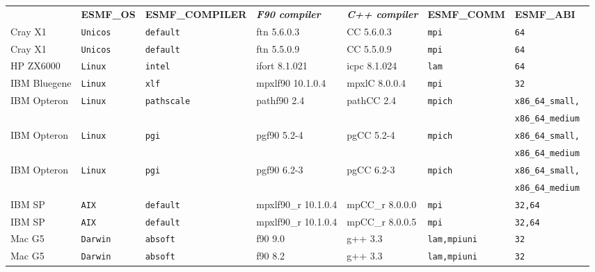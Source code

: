 \begin{tabular}{lllllll}
  &{\bfseries\footnotesize ESMF\_OS} &{\bfseries\footnotesize ESMF\_COMPILER} & {\bfseries\footnotesize\it F90 compiler} & {\bfseries\footnotesize\it C++ compiler} & {\bfseries\footnotesize ESMF\_COMM} & {\bfseries\footnotesize ESMF\_ABI} \\

Cray X1         &\tt Unicos &\tt default & ftn \footnotesize 5.6.0.3 & CC \footnotesize 5.6.0.3 &\tt mpi &\tt 64 \\
Cray X1         &\tt Unicos &\tt default & ftn \footnotesize 5.5.0.9 & CC \footnotesize 5.5.0.9 &\tt mpi &\tt 64 \\
HP ZX6000       &\tt Linux  &\tt intel   & ifort \footnotesize 8.1.021 & icpc \footnotesize 8.1.024 &\tt lam &\tt 64 \\
IBM Bluegene    &\tt Linux  &\tt xlf     & mpxlf90 \footnotesize 10.1.0.4 & mpxlC \footnotesize 8.0.0.4 &\tt mpi &\tt 32 \\
IBM Opteron     &\tt Linux  &\tt pathscale & pathf90 \footnotesize 2.4 & pathCC \footnotesize 2.4 &\tt mpich &\tt x86\_64\_small, \\
                &           &              &                           &                          &          &\tt x86\_64\_medium \\
IBM Opteron     &\tt Linux  &\tt pgi     & pgf90 \footnotesize 5.2-4 & pgCC \footnotesize 5.2-4 &\tt mpich   &\tt x86\_64\_small, \\
                &           &            &                           &                          &            &\tt x86\_64\_medium \\
IBM Opteron     &\tt Linux  &\tt pgi     & pgf90 \footnotesize 6.2-3 & pgCC \footnotesize 6.2-3 &\tt mpich   &\tt x86\_64\_small, \\
                &           &            &                           &                          &            &\tt x86\_64\_medium \\
IBM SP          &\tt AIX    &\tt default & mpxlf90\_r \footnotesize 10.1.0.4 & mpCC\_r \footnotesize 8.0.0.0 &\tt mpi &\tt 32,64 \\
IBM SP          &\tt AIX    &\tt default & mpxlf90\_r \footnotesize 10.1.0.4 & mpCC\_r \footnotesize 8.0.0.5 &\tt mpi &\tt 32,64 \\
Mac G5          &\tt Darwin &\tt absoft  & f90 \footnotesize 9.0     & g++ \footnotesize 3.3    &\tt lam,mpiuni &\tt 32 \\
Mac G5          &\tt Darwin &\tt absoft  & f90 \footnotesize 8.2     & g++ \footnotesize 3.3    &\tt lam,mpiuni &\tt 32 \\

\end{tabular}
